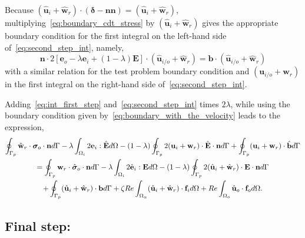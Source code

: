 Because $(\hat{\textbf{u}}_i+\hat{\textbf{w}}_r)\cdot (\bm\delta-\textbf{nn}) = (\hat{\textbf{u}}_i+\hat{\textbf{w}}_r)$, multiplying~\ref{eq:boundary_cdt_stress} by $(\hat{\textbf{u}}_i+\hat{\textbf{w}}_r)$ gives the appropriate boundary condition for the first integral on the left-hand side of~\ref{eq:second_step_int}, namely,
\begin{equation}
    \mathbf{n}\cdot 2[
        \textbf{e}_{o} - \lambda \textbf{e}_i 
        + (1 -\lambda) \textbf{E}
        ]\cdot (\hat{\textbf{u}}_{i/o}+\hat{\textbf{w}}_r)
        =
        \textbf{b}\cdot (\hat{\textbf{u}}_{i/o}+\hat{\textbf{w}}_r)
    \label{eq:boundary_with_the_velocity}
\end{equation}
with a similar relation for the test problem boundary condition and $({\textbf{u}}_{i/o}+{\textbf{w}}_r)$ in the first integral on the right-hand side of~\ref{eq:second_step_int}. 

Adding~\ref{eq:int_first_step} and~\ref{eq:second_step_int} times $2\lambda$, while using the boundary condition given by~\ref{eq:boundary_with_the_velocity} leads to the expression,
\begin{multline}
    \intS[p]{\hat{\textbf{w}}_{r} \cdot  \bm\sigma_{o}\cdot \textbf{n}}
    -\lambda \intO[i]{2\textbf{e}_i : \hat{\textbf{E}}}
    - (1-\lambda) \intS[p]{2(\textbf{u}_{i} + \textbf{w}_r)\cdot \hat{\textbf{E}}\cdot \textbf{n}}
    + \intS[p]{(\textbf{u}_{i} + \textbf{w}_r)\cdot \hat{\textbf{b}}}
    \\
    =
    \intS[p]{\textbf{w}_{r}\cdot \hat{\bm\sigma}_{o}\cdot \textbf{n}}
    - \lambda \intO[i]{2\hat{\textbf{e}}_i :\textbf{E}}
    - (1-\lambda) \intS[p]{2(\hat{\textbf{u}}_{i} + \hat{\textbf{w}}_r) \cdot  \textbf{E} \cdot \textbf{n}}\\ 
    + \intS[p]{(\hat{\textbf{u}}_{i} + \hat{\textbf{w}}_r) \cdot  \textbf{b}}
    + \zeta Re \intO{(\hat{\textbf{u}}_i+\hat{\textbf{w}}_r)\cdot \textbf{f}_{i}} 
    + Re\intO[o]{\hat{\textbf{u}}_{o}\cdot \textbf{f}_{o}}.
    \label{eq:int_third_step}
\end{multline}

\subsection{Final step:}

